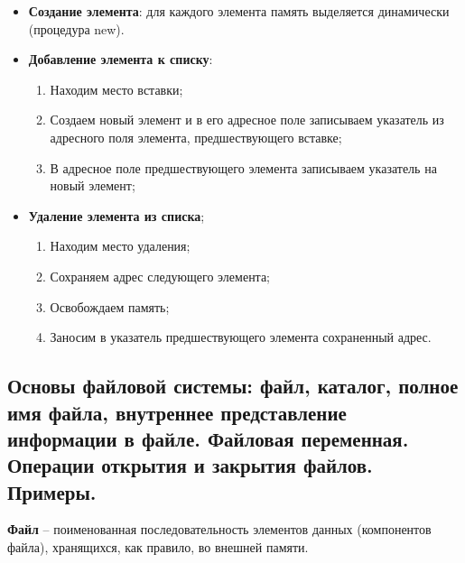 \begin{itemize}
    \item {\bf Создание элемента}: для каждого элемента память выделяется динамически (процедура new).
    
    \item {\bf Добавление элемента к списку}:
    \begin{enumerate}
    \item Находим место вставки;

    \item Создаем новый элемент и в его адресное поле записываем указатель из адресного поля элемента, предшествующего вставке;

    \item В адресное поле предшествующего элемента записываем указатель на новый элемент;
    \end{enumerate}
    \item {\bf Удаление элемента из списка};
    \begin{enumerate}
        \item Находим место удаления;
        \item Сохраняем адрес следующего элемента;
        \item Освобождаем память;
        \item Заносим в указатель предшествующего элемента сохраненный адрес. 
    \end{enumerate}

\end{itemize}

\vspace*{100pt}





\newpage\subsection{Основы файловой системы: файл, каталог, полное имя файла, внутреннее представление 
информации в файле. Файловая переменная. Операции открытия и закрытия файлов. Примеры. }

\begin{myquote}
            
\end{myquote}

{\bf Файл} – поименованная  последовательность элементов данных (компонентов файла), хранящихся, как правило, во внешней памяти. 

